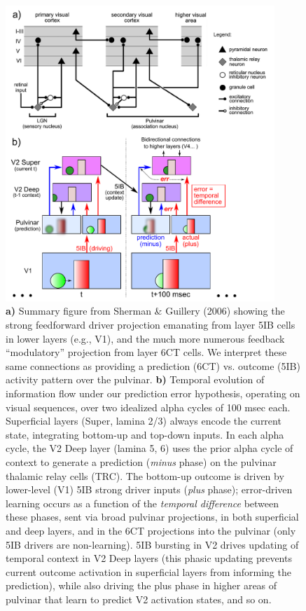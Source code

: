 \documentclass[11pt,twoside]{article}
\newif\myifpdf
\begin{document}
\begin{figure}
  \centering\includegraphics[width=4in]{fig_01} %
  \caption{{\bf a)} Summary figure from Sherman \& Guillery (2006) showing the strong feedforward driver projection emanating from layer 5IB cells in lower layers (e.g., V1), and the much more numerous feedback ``modulatory'' projection from layer 6CT cells.  We interpret these same connections as providing a prediction (6CT) vs. outcome (5IB) activity pattern over the pulvinar.  {\bf b)} Temporal evolution of information flow under our prediction error hypothesis, operating on visual sequences, over two idealized alpha cycles of 100 msec each.  Superficial layers (Super, lamina 2/3) always encode the current state, integrating bottom-up and top-down inputs.  In each alpha cycle, the V2 Deep layer (lamina 5, 6) uses the prior alpha cycle of context to generate a prediction (\emph{minus} phase) on the pulvinar thalamic relay cells (TRC). The bottom-up outcome is driven by lower-level (V1) 5IB strong driver inputs (\emph{plus} phase); error-driven learning occurs as a function of the \emph{temporal difference} between these phases, sent via broad pulvinar projections, in both superficial and deep layers, and in the 6CT projections into the pulvinar (only 5IB drivers are non-learning).  5IB bursting in V2 drives updating of temporal context in V2 Deep layers (this phasic updating prevents current outcome activation in superficial layers from informing the prediction), while also driving the plus phase in higher areas of pulvinar that learn to predict V2 activation states, and so on.}
  \label{fig.sg06}
\end{figure}
\end{document}
